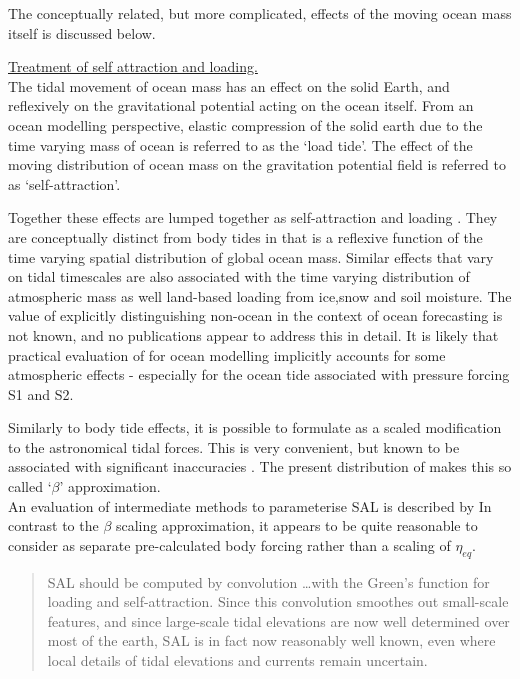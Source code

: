 The conceptually related, but more complicated, effects of the moving ocean mass itself is discussed below.

\underline{Treatment of self attraction and loading.} \\
The tidal movement of ocean mass has an effect on the solid Earth, and reflexively on the gravitational potential acting on the ocean itself.
From an ocean modelling perspective, elastic compression of the solid earth due to the time varying mass of ocean is referred to as the `load tide'.  The effect of the moving distribution of ocean mass on the gravitation potential field is referred to as `self-attraction'.

Together these effects are lumped together as self-attraction and loading \SAL{}.  They are conceptually distinct from body tides in that \SAL{} is a reflexive function of the time varying spatial distribution of global ocean mass.
Similar effects that vary on tidal timescales are also associated with the time varying distribution of atmospheric mass as well land-based loading from ice,snow and soil moisture.  The value of explicitly distinguishing non-ocean \SAL{} in the context of ocean forecasting is not known, and no publications appear to address this in detail.  It is likely that practical evaluation of \SAL{} for ocean modelling implicitly accounts for some atmospheric effects - especially for the ocean tide associated with pressure forcing S1 and S2.


Similarly to body tide effects, it is possible to formulate \SAL{} as a scaled modification to the astronomical tidal forces.  This is very convenient, but known to be associated with significant inaccuracies \citep{Ray:1998jl}.  The present distribution of \MOM{} makes this so called `$\beta$' approximation.\\
An evaluation of intermediate methods to parameterise SAL is described by \citet{Stepanov:2004up}
In contrast to the $\beta$ scaling approximation, it appears to be quite reasonable to consider \SAL{} as separate pre-calculated body forcing rather than a scaling of $\eta_{eq}$. 
\begin{quotation} \noindent
SAL should be computed by convolution \dots with the Green's function for loading and self-attraction. Since this convolution smoothes out small-scale features, and since large-scale tidal elevations are now well determined over most	of the earth, SAL is in fact now reasonably well known, even where local details of tidal elevations and currents remain uncertain. \citep{Egbert:2002ug}
\end{quotation}


